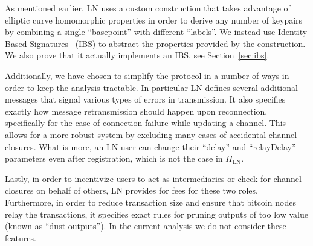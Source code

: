    As mentioned earlier, LN uses a custom construction that takes advantage of
    elliptic curve homomorphic properties in order to derive any number of
    keypairs by combining a single ``basepoint'' with different ``labels''. We
    instead use  Identity Based Signatures~\cite{ibsshamir,ibspaterson} (IBS)
    to abstract the properties provided by the construction.  We also prove that
    it actually implements an IBS, see Section~\ref{sec:ibs}.

    Additionally, we have chosen to simplify the protocol in a number of ways in
    order to keep the analysis tractable. In particular LN defines several
    additional messages that signal various types of errors in transmission. It
    also specifies exactly how message retransmission should happen upon
    reconnection, specifically for the case of connection failure while updating
    a channel. This allows for a more robust system by excluding many cases of
    accidental channel closures. What is more, an LN user can change their
    ``delay'' and ``relayDelay'' parameters even after registration, which is
    not the case in $\Pi_{\mathrm{LN}}$.

    Lastly, in order to incentivize users to act as intermediaries or check for
    channel closures on behalf of others, LN provides for fees for these two
    roles. Furthermore, in order to reduce transaction size and ensure that
    bitcoin nodes relay the transactions, it specifies exact rules for pruning
    outputs of too low value (known as ``dust outputs''). In the current
    analysis we do not consider these features.
  \ifelseieee{}{\end{remark}}
